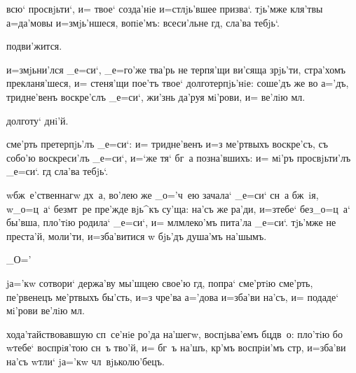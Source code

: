 

всю` просвjьти`, и= твое` созда'нiе и=стлjь'вшее призва`. 
тjь'мже кля'твы а=да'мовы и=змjь'ншеся, вопiе'мъ: 
всеси'льне гд, сла'ва тебjь`.

подви'жится.

и=змjьни'лся _е=си`, _е=го'же тва'рь не терпя'щи ви'сяща 
зрjь'ти, стра'хомъ прекланя'шеся, и= стеня'щи пое'тъ 
твое` долготерпjь'нiе: соше'дъ же во а='дъ, тридне'венъ 
воскре'слъ _е=си`, жи'знь да'руя мi'рови, и= ве'лiю 
мл.

долготу` днi'й.

сме'рть претерпjь'лъ _е=си`: и= тридне'венъ и=з\ъ 
ме'ртвыхъ воскре'съ, съ собо'ю воскреси'лъ _е=си`, и=`же 
тя` бг~а позна'вшихъ: и= мi'ръ просвjьти'лъ _е=си`. гд 
сла'ва тебjь`.

w\т бж~е'ственнагw дх~а, во'лею же _о='ч~ею зачала` 
_е=си` сн~а бж~iя, w\т _о=ц~а` без\ъ мт~ре пре'жде вjь^къ 
су'ща: на'съ же ра'ди, и=з\ъ тебе` без\ъ _о=ц~а` бы'вша, 
пло'тiю родила` _е=си`, и= мл млеко'мъ пита'ла 
_е=си`. тjь'мже не преста'й, моли'ти, и=зба'витися w\т 
бjь'дъ душа'мъ на'шымъ.

_О='%


jа='кw сотвори` держа'ву мы'шцею свое'ю гд, попра` 
сме'ртiю сме'рть, пе'рвенецъ ме'ртвыхъ бы'сть, и=з\ъ 
чре'ва а='дова и=зба'ви на'съ, и= подаде` мi'рови ве'лiю 
мл.

хода'тайствовавшую сп~се'нiе ро'да на'шегw, воспjьва'емъ 
бц дв~о: пло'тiю бо w\т тебе` воспрiя'тою сн~ъ тво'й, 
и= бг~ъ на'шъ, кр'мъ воспрiи'мъ стр, и=зба'ви 
на'съ w\т тли` jа='кw чл~вjьколю'бецъ.

